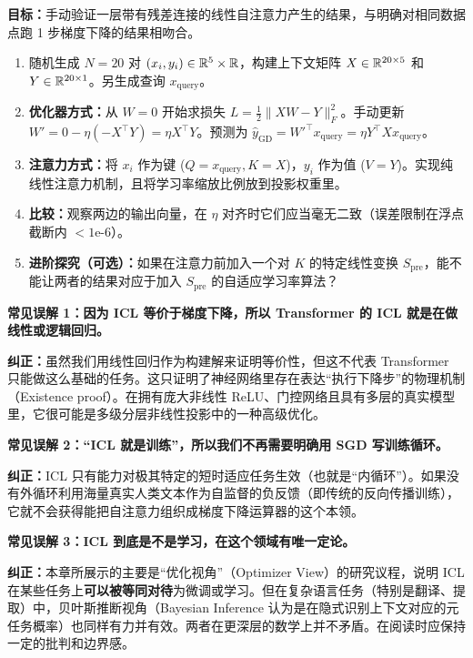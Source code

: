 \begin{labbox}[title=Lab 6: 验证 ICL 的内部梯度下降等价性]
\textbf{目标：}手动验证一层带有残差连接的线性自注意力产生的结果，与明确对相同数据点跑 1 步梯度下降的结果相吻合。

\begin{enumerate}
    \item 随机生成 $N=20$ 对 $(x_i, y_i) \in \mathbb{R}^5 \times \mathbb{R}$，构建上下文矩阵 $X \in \mathbb{R}^{20 \times 5}$ 和 $Y \in \mathbb{R}^{20 \times 1}$。另生成查询 $x_\text{query}$。
    \item \textbf{优化器方式：}从 $W=0$ 开始求损失 $L = \frac{1}{2}\|XW - Y\|_F^2$。手动更新 $W' = 0 - \eta (-X^\top Y) = \eta X^\top Y$。预测为 $\hat{y}_\text{GD} = W'^\top x_\text{query} = \eta Y^\top X x_\text{query}$。
    \item \textbf{注意力方式：}将 $x_i$ 作为键 ($Q=x_\text{query}, K=X$)，$y_i$ 作为值 ($V=Y$)。实现纯线性注意力机制，且将学习率缩放比例放到投影权重里。
    \item \textbf{比较：}观察两边的输出向量，在 $\eta$ 对齐时它们应当毫无二致（误差限制在浮点截断内 $<1\text{e-}6$）。
    \item \textbf{进阶探究（可选）：}如果在注意力前加入一个对 $K$ 的特定线性变换 $S_\text{pre}$，能不能让两者的结果对应于加入 $S_\text{pre}$ 的自适应学习率算法？
\end{enumerate}
\end{labbox}

\begin{misconceptionbox}
\textbf{常见误解 1：因为 ICL 等价于梯度下降，所以 Transformer 的 ICL 就是在做线性或逻辑回归。}

\textbf{纠正：}虽然我们用线性回归作为构建解来证明等价性，但这不代表 Transformer 只能做这么基础的任务。这只证明了神经网络里存在表达“执行下降步”的物理机制（Existence proof）。在拥有庞大非线性 ReLU、门控网络且具有多层的真实模型里，它很可能是多级分层非线性投影中的一种高级优化。
\end{misconceptionbox}

\begin{misconceptionbox}
\textbf{常见误解 2：“ICL 就是训练”，所以我们不再需要明确用 SGD 写训练循环。}

\textbf{纠正：}ICL 只有能力对极其特定的短时适应任务生效（也就是“内循环”）。如果没有外循环利用海量真实人类文本作为自监督的负反馈（即传统的反向传播训练），它就不会获得能把自注意力组织成梯度下降运算器的这个本领。
\end{misconceptionbox}

\begin{misconceptionbox}
\textbf{常见误解 3：ICL 到底是不是学习，在这个领域有唯一定论。}

\textbf{纠正：}本章所展示的主要是“优化视角”（Optimizer View）的研究议程，说明 ICL 在某些任务上\textbf{可以被等同对待}为微调或学习。但在复杂语言任务（特别是翻译、提取）中，贝叶斯推断视角（Bayesian Inference 认为是在隐式识别上下文对应的元任务概率）也同样有力并有效。两者在更深层的数学上并不矛盾。在阅读时应保持一定的批判和边界感。
\end{misconceptionbox}

